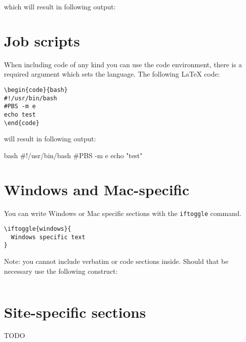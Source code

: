 \documentclass[11pt,a4paper]{article}
\begin{document}
which will result in following output:

\section{Job scripts}
\label{sec:job-scripts}

When including code of any kind you can use the code environment, there is a
required argument which sets the language. The following LaTeX code:

\begin{verbatim}
\begin{code}{bash}
#!/usr/bin/bash
#PBS -m e
echo test
\end{code}
\end{verbatim}

will result in following output:

\begin{code}{bash}
#!/usr/bin/bash
#PBS -m e
echo "test"
\end{code}

\section{Windows and Mac-specific}

You can write Windows or Mac specific sections with the \texttt{iftoggle} command.
\begin{verbatim}
\iftoggle{windows}{
  Windows specific text
}
\end{verbatim}

Note: you cannot include verbatim or code sections inside. Should that be necessary use the following construct:

\begin{verbatim}
\end{verbatim}



\section{Site-specific sections}
TODO
\end{document}
